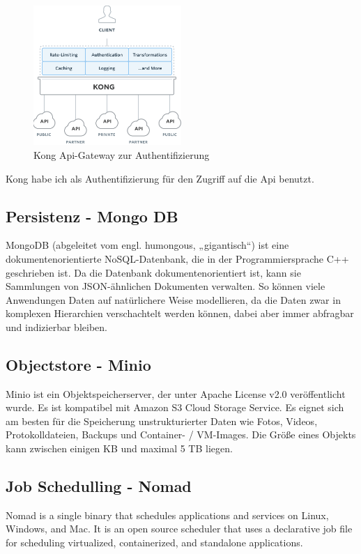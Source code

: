 \documentclass[12pt]{article}
\begin{document}
\begin{figure}[h!]
  \centering
  \includegraphics[width=0.5\textwidth]{images/kong_arch2.png}
  \caption{Kong Api-Gateway zur Authentifizierung}
  \label{}
\end{figure}

Kong habe ich als Authentifizierung für den Zugriff auf die Api benutzt.


\subsection{Persistenz - Mongo DB}

MongoDB (abgeleitet vom engl. humongous, „gigantisch“) ist eine dokumentenorientierte NoSQL-Datenbank, die in der Programmiersprache C++ geschrieben ist. Da die Datenbank dokumentenorientiert ist, kann sie Sammlungen von JSON-ähnlichen Dokumenten verwalten. So können viele Anwendungen Daten auf natürlichere Weise modellieren, da die Daten zwar in komplexen Hierarchien verschachtelt werden können, dabei aber immer abfragbar und indizierbar bleiben.

\subsection{Objectstore - Minio}

Minio ist ein Objektspeicherserver, der unter Apache License v2.0 veröffentlicht wurde. Es ist kompatibel mit Amazon S3 Cloud Storage Service. Es eignet sich am besten für die Speicherung unstrukturierter Daten wie Fotos, Videos, Protokolldateien, Backups und Container- / VM-Images. Die Größe eines Objekts kann zwischen einigen KB und maximal 5 TB liegen.

\subsection{Job Schedulling - Nomad}
Nomad is a single binary that schedules applications and services on Linux, Windows, and Mac. It is an open source scheduler that uses a declarative job file for scheduling virtualized, containerized, and standalone applications.
\end{document}
